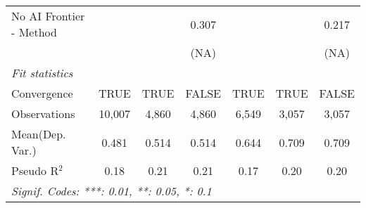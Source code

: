 \begin{tabular}{lcccccc}
   No AI Frontier - Method &               &               & 0.307 &               &               & 0.217\\   
                           &               &               & (NA)  &               &               & (NA)\\   
   \midrule
   \emph{Fit statistics}\\
   Convergence             &TRUE           & TRUE          & FALSE & TRUE          & TRUE          & FALSE\\  
   Observations            & 10,007        & 4,860         & 4,860 & 6,549         & 3,057         & 3,057\\  
Mean(Dep. Var.) & 0.481 & 0.514 & 0.514 & 0.644 & 0.709 & 0.709 \\
   Pseudo R$^2$            & 0.18          & 0.21          & 0.21  & 0.17          & 0.20          & 0.20\\  
   \midrule \midrule
   \multicolumn{7}{l}{\emph{Signif. Codes: ***: 0.01, **: 0.05, *: 0.1}}\\
\end{tabular}
\par\endgroup
